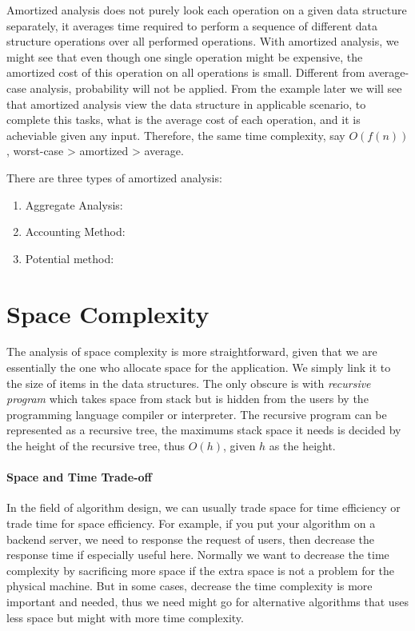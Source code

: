 \documentclass[../main.tex]{subfiles}
\begin{document}
Amortized analysis does not purely look each operation on a given data structure separately, it averages time required to perform a sequence of different data structure operations over all performed operations. With amortized analysis, we might see that even though one single operation might be expensive, the amortized cost of this operation on all operations is small. Different from average-case analysis, probability will not be applied. From the example later we will see that amortized analysis view the data structure in applicable scenario, to complete this tasks, what is the average cost of each operation, and it is acheviable given any input. Therefore, the same time complexity, say $O(f(n))$, worst-case > amortized > average.

There are three types of amortized analysis:
\begin{enumerate}
    \item Aggregate Analysis:
    \item Accounting Method:
    \item Potential method: 
\end{enumerate}
\section{Space Complexity}
The analysis of space complexity is more straightforward, given that we are essentially the one who allocate space for the application. We simply link it to the size of items in the data structures. The only obscure is with \textit{recursive program} which takes space from stack but is hidden from the users by the programming language compiler or interpreter. The recursive program can be represented as a recursive tree, the maximums stack space it needs is decided by the height of the recursive tree, thus $O(h)$, given $h$ as the height.

\paragraph{Space and Time Trade-off} In the field of algorithm design, we can usually trade space for time efficiency or trade time for space efficiency. For example, if you put your algorithm on a backend server, we need to response the request of users, then decrease the response time if especially useful here. Normally we want to decrease the time complexity by sacrificing more space if the extra space is not a problem for the physical machine. But in some cases, decrease the time complexity is more important and needed, thus we need might go for alternative algorithms that uses less space but might with more time complexity. 
\end{document}
